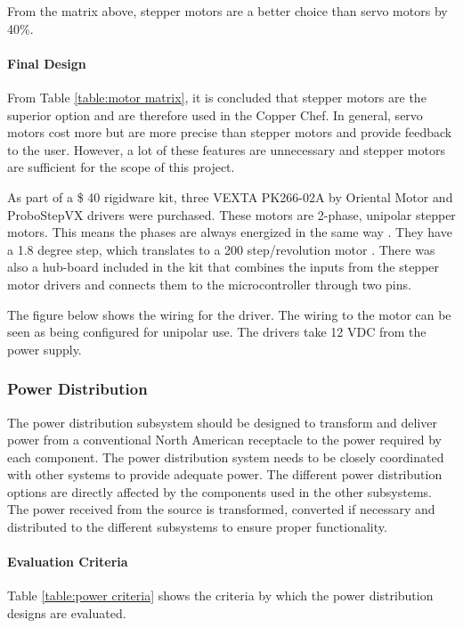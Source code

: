 \documentclass[11pt]{article}
\newcommand{\subsubsubsection}[1]{\paragraph{#1}\mbox{}}
\begin{document}
From the matrix above, stepper motors are a better choice than servo motors by 40\%.

\subsubsubsection{Final Design}

\noindent
From Table \ref{table:motor matrix}, it is concluded that stepper motors are the superior option and are therefore used in the Copper Chef.
In general, servo motors cost more but are more precise than stepper motors and provide feedback to the user.
However, a lot of these features are unnecessary and stepper motors are sufficient for the scope of this project.

As part of a \$ 40 rigidware kit, three VEXTA PK266-02A by Oriental Motor \cite{se11} and ProboStepVX drivers \cite{se12} were purchased.
These motors are 2-phase, unipolar stepper motors.
This means the phases are always energized in the same way \cite{se13}.
They have a 1.8 degree step, which translates to a 200 step/revolution motor \cite{se13}.
There was also a hub-board included in the kit that combines the inputs from the stepper motor drivers and connects them to the microcontroller through two pins.

The figure below shows the wiring for the driver.
The wiring to the motor can be seen as being configured for unipolar use.
The drivers take 12 VDC from the power supply.

\subsubsection{Power Distribution}

The power distribution subsystem should be designed to transform and deliver power from a conventional North American receptacle to the power required by each component.
The power distribution system needs to be closely coordinated with other systems to provide adequate power.
The different power distribution options are directly affected by the components used in the other subsystems.
The power received from the source is transformed, converted if necessary and distributed to the different subsystems to ensure proper functionality.

\subsubsubsection{Evaluation Criteria}

\noindent
Table \ref{table:power criteria} shows the criteria by which the power distribution designs are evaluated.
\end{document}
